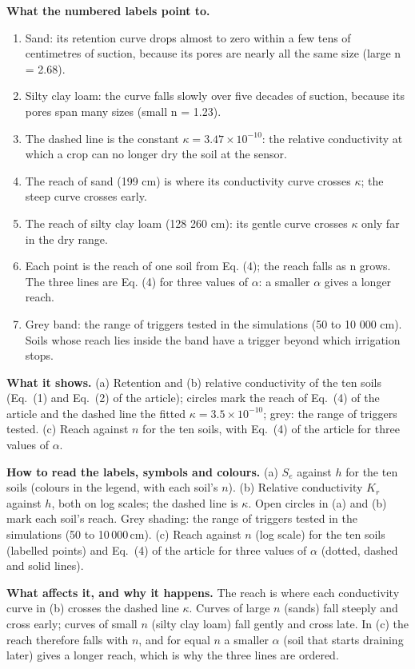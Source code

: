 \textbf{What the numbered labels point to.}
\begin{enumerate}[nosep,label=\protect\circled{\arabic*}]
\item Sand: its retention curve drops almost to zero within a few tens of centimetres of suction, because its pores are nearly all the same size (large n = 2.68).
\item Silty clay loam: the curve falls slowly over five decades of suction, because its pores span many sizes (small n = 1.23).
\item The dashed line is the constant $\kappa=3.47\times10^{-10}$: the relative conductivity at which a crop can no longer dry the soil at the sensor.
\item The reach of sand (199 cm) is where its conductivity curve crosses $\kappa$; the steep curve crosses early.
\item The reach of silty clay loam (128 260 cm): its gentle curve crosses $\kappa$ only far in the dry range.
\item Each point is the reach of one soil from Eq. (4); the reach falls as n grows. The three lines are Eq. (4) for three values of $\alpha$: a smaller $\alpha$ gives a longer reach.
\item Grey band: the range of triggers tested in the simulations (50 to 10 000 cm). Soils whose reach lies inside the band have a trigger beyond which irrigation stops.
\end{enumerate}

\textbf{What it shows.} (a) Retention and (b) relative conductivity of the ten soils (Eq.~(1) and Eq.~(2) of the article); circles mark the reach of Eq.~(4) of the article and the dashed line the fitted $\kappa=3.5\times10^{-10}$; grey: the range of triggers tested. (c) Reach against $n$ for the ten soils, with Eq.~(4) of the article for three values of $\alpha$.

\textbf{How to read the labels, symbols and colours.} (a) $S_e$ against $h$ for the ten soils (colours in the legend, with each soil's $n$). (b) Relative conductivity $K_r$ against $h$, both on log scales; the dashed line is $\kappa$. Open circles in (a) and (b) mark each soil's reach. Grey shading: the range of triggers tested in the simulations (50 to 10\,000\,cm). (c) Reach against $n$ (log scale) for the ten soils (labelled points) and Eq.~(4) of the article for three values of $\alpha$ (dotted, dashed and solid lines).

\textbf{What affects it, and why it happens.} The reach is where each conductivity curve in (b) crosses the dashed line $\kappa$. Curves of large $n$ (sands) fall steeply and cross early; curves of small $n$ (silty clay loam) fall gently and cross late. In (c) the reach therefore falls with $n$, and for equal $n$ a smaller $\alpha$ (soil that starts draining later) gives a longer reach, which is why the three lines are ordered.

